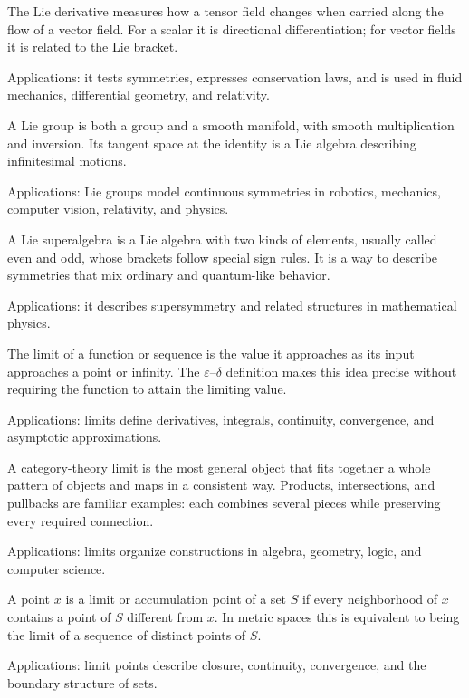 The Lie derivative measures how a tensor field changes when carried along the flow of a vector field. For a scalar it is directional differentiation; for vector fields it is related to the Lie bracket. \par\noindent Applications: it tests symmetries, expresses conservation laws, and is used in fluid mechanics, differential geometry, and relativity.

A Lie group is both a group and a smooth manifold, with smooth multiplication and inversion. Its tangent space at the identity is a Lie algebra describing infinitesimal motions. \par\noindent Applications: Lie groups model continuous symmetries in robotics, mechanics, computer vision, relativity, and physics.

A Lie superalgebra is a Lie algebra with two kinds of elements, usually called even and odd, whose brackets follow special sign rules. It is a way to describe symmetries that mix ordinary and quantum-like behavior. \par\noindent Applications: it describes supersymmetry and related structures in mathematical physics.

The limit of a function or sequence is the value it approaches as its input approaches a point or infinity. The $\varepsilon$--$\delta$ definition makes this idea precise without requiring the function to attain the limiting value. \par\noindent Applications: limits define derivatives, integrals, continuity, convergence, and asymptotic approximations.

A category-theory limit is the most general object that fits together a whole pattern of objects and maps in a consistent way. Products, intersections, and pullbacks are familiar examples: each combines several pieces while preserving every required connection. \par\noindent Applications: limits organize constructions in algebra, geometry, logic, and computer science.

A point $x$ is a limit or accumulation point of a set $S$ if every neighborhood of $x$ contains a point of $S$ different from $x$. In metric spaces this is equivalent to being the limit of a sequence of distinct points of $S$. \par\noindent Applications: limit points describe closure, continuity, convergence, and the boundary structure of sets.

